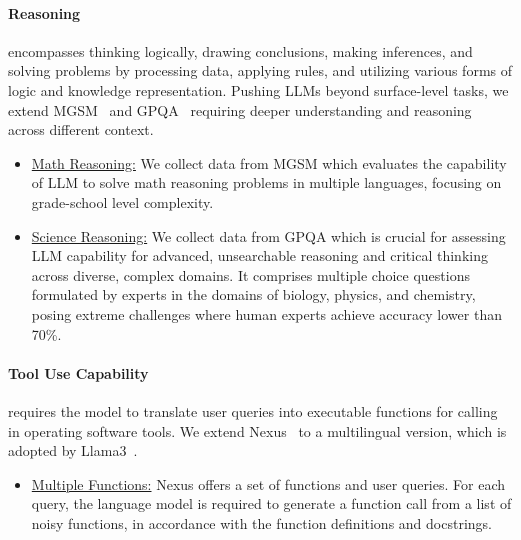 \paragraph{Reasoning} encompasses thinking logically, drawing conclusions, making inferences, and solving problems by processing data, applying rules, and utilizing various forms of logic and knowledge representation. Pushing LLMs beyond surface-level tasks, we extend MGSM~\cite{shi2023language} and GPQA~\cite{Rein2023GPQAAG} requiring deeper understanding and reasoning across different context.
\begin{itemize}[nosep,itemsep=1pt,leftmargin=0.1cm]
    \item \underline{Math Reasoning:} We collect data from MGSM which evaluates the capability of LLM to solve math reasoning problems in multiple languages, focusing on grade-school level complexity.
    \item \underline{Science Reasoning:} We collect data from GPQA which is crucial for assessing LLM capability for advanced, unsearchable reasoning and critical thinking across diverse, complex domains. It comprises multiple choice questions formulated by experts in the domains of biology, physics, and chemistry, posing extreme challenges where human experts achieve accuracy lower than 70\%.
\end{itemize}

\paragraph{Tool Use Capability} requires the model to translate user queries into executable functions for calling in operating software tools. We extend Nexus~\cite{srinivasan2023nexusraven} to a multilingual version, which is adopted by Llama3~\cite{dubey2024llama}. 
\begin{itemize}[nosep,itemsep=1pt,leftmargin=0.1cm]
    \item \underline{Multiple Functions:} Nexus offers a set of functions and user queries. For each query, the language model is required to generate a function call from a list of noisy functions, in accordance with the function definitions and docstrings. 
\end{itemize}


